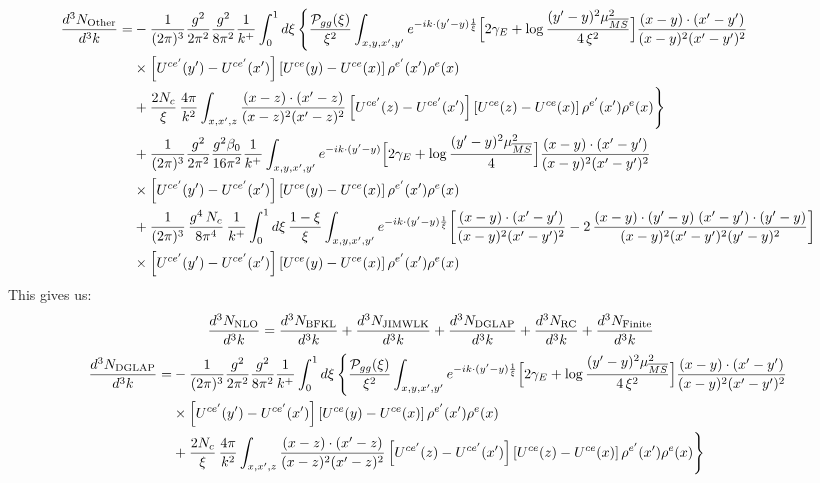 \documentclass[9pt]{article}
\numberwithin{equation}{section}
\begin{document}
\begin{align}
\frac{d^{3}N_{\rm Other}}{d^{3}k}= &-\frac{1}{(2\pi)^{3}}\frac{g^{2}}{2\pi^{2}}\frac{g^{2}}{8\pi^{2}}\frac{1}{k^{+}}\int_{0}^{1}d\xi\,\Bigg\{\frac{\mathcal P_{gg}(\xi)}{\xi^{2}}\int_{x,y,x',y'}e^{-ik\cdot(y'-y)\frac{1}{\xi}}\Big[2\gamma_{E}+\log\frac{(y'-y)^{2}\mu^{2}_{\overline{MS}}}{4\,\xi^{2}}\Big]\frac{(x-y)\cdot(x'-y')}{(x-y)^{2}(x'-y')^{2}}\notag\\
&\times\left[U^{ce'}(y') - U^{ce'}(x')\right]\left[U^{ce}(y) - U^{ce}(x)\right]\rho^{e'}(x')\rho^{e}(x)\notag\\
&+\frac{2N_{c}}{\xi}\,\frac{4\pi}{k^{2}}\int_{x,x',z}\frac{(x-z)\cdot(x'-z)}{(x-z)^{2}(x'-z)^{2}}\left[U^{ce'}(z) - U^{ce'}(x')\right]\left[U^{ce}(z) - U^{ce}(x)\right]\rho^{e'}(x')\rho^{e}(x)\Bigg\}\notag\\
&+\frac{1}{(2\pi)^{3}}\frac{g^{2}}{2\pi^{2}}\frac{g^{2}\beta_{0}}{16\pi^{2}}\frac{1}{k^{+}}\int_{x,y,x',y'}e^{-ik\cdot(y'-y)}\Big[2\gamma_{E}+\log\frac{(y'-y)^{2}\mu^{2}_{\overline{MS}}}{4}\Big]\frac{(x-y)\cdot(x'-y')}{(x-y)^{2}(x'-y')^{2}}\notag\\
&\times\left[U^{ce'}(y') - U^{ce'}(x')\right]\left[U^{ce}(y) - U^{ce}(x)\right]\rho^{e'}(x')\rho^{e}(x)\notag\\
&+\frac{1}{(2\pi)^{3}}\,\frac{g^{4}\,N_{c}}{8\pi^{4}}\,\frac{1}{k^{+}}\int_{0}^{1}d\xi\,\frac{1-\xi}{\xi}\int_{x,y,x',y'}e^{-ik\cdot(y'-y)\frac{1}{\xi}}\bigg[\frac{(x-y)\cdot(x'-y')}{(x-y)^{2}(x'-y')^{2}}-2\,\frac{(x-y)\cdot(y'-y)\;(x'-y')\cdot(y'-y)}{(x-y)^{2}(x'-y')^{2}(y'-y)^{2}}\bigg]\notag\\
&\times\left[U^{ce'}(y') - U^{ce'}(x')\right]\left[U^{ce}(y) - U^{ce}(x)\right]\rho^{e'}(x')\rho^{e}(x)
\end{align}
This gives us: 
\begin{align}
    \frac{d^{3}N_{\rm NLO}}{d^{3}k} & = \frac{d^{3}N_{\rm BFKL}}{d^{3}k}+ \frac{d^{3}N_{\rm JIMWLK}}{d^{3}k}+\frac{d^{3}N_{\rm DGLAP}}{d^{3}k} + \frac{d^{3}N_{\rm RC}}{d^{3}k} + \frac{d^{3}N_{\rm Finite}}{d^{3}k}
\end{align}
\begin{align}
\frac{d^{3}N_{\rm DGLAP}}{d^{3}k}= &-\frac{1}{(2\pi)^{3}}\frac{g^{2}}{2\pi^{2}}\frac{g^{2}}{8\pi^{2}}\frac{1}{k^{+}}\int_{0}^{1}d\xi\,\Bigg\{\frac{\mathcal P_{gg}(\xi)}{\xi^{2}}\int_{x,y,x',y'}e^{-ik\cdot(y'-y)\frac{1}{\xi}}\Big[2\gamma_{E}+\log\frac{(y'-y)^{2}\mu^{2}_{\overline{MS}}}{4\,\xi^{2}}\Big]\frac{(x-y)\cdot(x'-y')}{(x-y)^{2}(x'-y')^{2}}\notag\\
&\times\left[U^{ce'}(y') - U^{ce'}(x')\right]\left[U^{ce}(y) - U^{ce}(x)\right]\rho^{e'}(x')\rho^{e}(x)\notag\\
&+\frac{2N_{c}}{\xi}\,\frac{4\pi}{k^{2}}\int_{x,x',z}\frac{(x-z)\cdot(x'-z)}{(x-z)^{2}(x'-z)^{2}}\left[U^{ce'}(z) - U^{ce'}(x')\right]\left[U^{ce}(z) - U^{ce}(x)\right]\rho^{e'}(x')\rho^{e}(x)\Bigg\}
\end{align}
\end{document}
